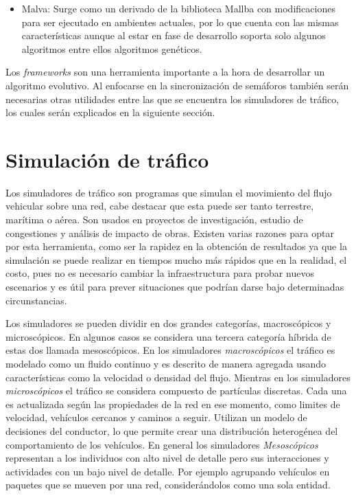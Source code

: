 \begin{itemize}
	\item Malva: Surge como un derivado de la biblioteca Mallba con modificaciones para ser ejecutado en ambientes actuales, por lo que cuenta con las mismas características aunque al estar en fase de desarrollo soporta solo algunos algoritmos entre ellos algoritmos genéticos. \citep{Malva}
\end{itemize}

Los \emph{frameworks} son una herramienta importante a la hora de desarrollar un algoritmo evolutivo. Al enfocarse en la sincronización de semáforos también serán necesarias otras utilidades entre las que se encuentra los simuladores de tráfico, los cuales serán explicados en la siguiente sección.


\section{Simulación de tráfico}

Los simuladores de tráfico son programas que simulan el movimiento del flujo vehicular sobre una red, cabe destacar que esta puede ser tanto terrestre, marítima o aérea. Son usados en proyectos de investigación, estudio de congestiones y análisis de impacto de obras.  Existen varias razones para optar por esta herramienta, como ser la rapidez en la obtención de resultados ya que la simulación se puede realizar en tiempos mucho más rápidos que en la realidad, el costo, pues no es necesario cambiar la infraestructura para probar nuevos escenarios y es útil para prever situaciones que podrían darse bajo determinadas circunstancias.

Los simuladores se pueden dividir en dos grandes categorías, macroscópicos y microscópicos. En algunos casos se considera una tercera categoría híbrida de estas dos llamada mesoscópicos. En los simuladores \emph{macroscópicos} el tráfico es modelado como un fluido continuo y es descrito de manera agregada usando características como la velocidad o densidad del flujo. Mientras en los simuladores \emph{microscópicos} el tráfico se considera compuesto de partículas discretas. Cada una es actualizada según las propiedades de la red en ese momento, como limites de velocidad, vehículos cercanos y caminos a seguir. Utilizan un modelo de decisiones del conductor, lo que permite crear una distribución heterogénea del comportamiento de los vehículos. En general los simuladores \emph{Mesoscópicos} representan a los individuos con alto nivel de detalle pero sus interacciones y actividades con un bajo nivel de detalle. Por ejemplo agrupando vehículos en paquetes que se mueven por una red, considerándolos como una sola entidad.


